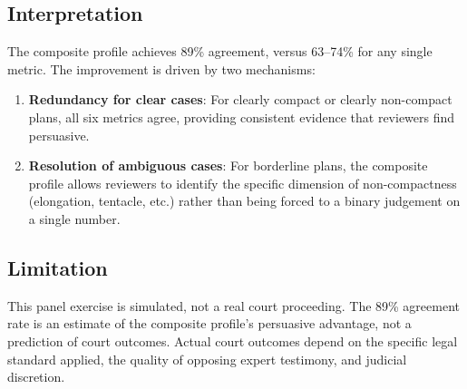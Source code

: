 \subsection{Interpretation}

The composite profile achieves 89\% agreement, versus 63--74\% for any single metric.
The improvement is driven by two mechanisms:
\begin{enumerate}
  \item \textbf{Redundancy for clear cases}: For clearly compact or clearly
    non-compact plans, all six metrics agree, providing consistent evidence
    that reviewers find persuasive.
  \item \textbf{Resolution of ambiguous cases}: For borderline plans, the
    composite profile allows reviewers to identify the specific dimension of
    non-compactness (elongation, tentacle, etc.) rather than being forced to
    a binary judgement on a single number.
\end{enumerate}

\subsection{Limitation}

This panel exercise is simulated, not a real court proceeding.
The 89\% agreement rate is an estimate of the composite profile's persuasive advantage,
not a prediction of court outcomes.
Actual court outcomes depend on the specific legal standard applied,
the quality of opposing expert testimony, and judicial discretion.
